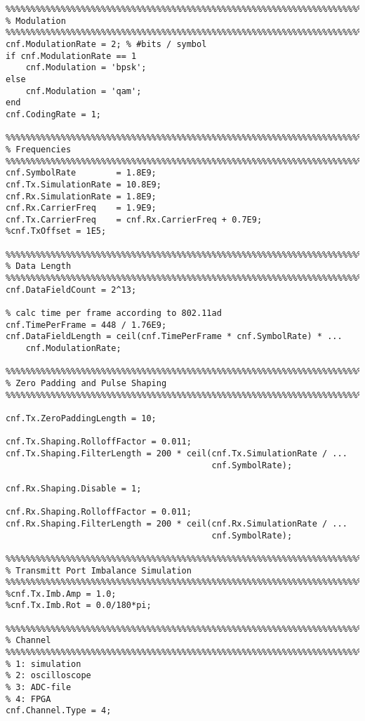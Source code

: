 \begin{appendix}
\begin{verbatim}
%%%%%%%%%%%%%%%%%%%%%%%%%%%%%%%%%%%%%%%%%%%%%%%%%%%%%%%%%%%%%%%%%%%%%%%%%%%%%%%%
% Modulation
%%%%%%%%%%%%%%%%%%%%%%%%%%%%%%%%%%%%%%%%%%%%%%%%%%%%%%%%%%%%%%%%%%%%%%%%%%%%%%%%
cnf.ModulationRate = 2; % #bits / symbol
if cnf.ModulationRate == 1
    cnf.Modulation = 'bpsk';
else
    cnf.Modulation = 'qam';
end
cnf.CodingRate = 1;

%%%%%%%%%%%%%%%%%%%%%%%%%%%%%%%%%%%%%%%%%%%%%%%%%%%%%%%%%%%%%%%%%%%%%%%%%%%%%%%%
% Frequencies
%%%%%%%%%%%%%%%%%%%%%%%%%%%%%%%%%%%%%%%%%%%%%%%%%%%%%%%%%%%%%%%%%%%%%%%%%%%%%%%%
cnf.SymbolRate        = 1.8E9;
cnf.Tx.SimulationRate = 10.8E9;
cnf.Rx.SimulationRate = 1.8E9;
cnf.Rx.CarrierFreq    = 1.9E9;
cnf.Tx.CarrierFreq    = cnf.Rx.CarrierFreq + 0.7E9;
%cnf.TxOffset = 1E5;

%%%%%%%%%%%%%%%%%%%%%%%%%%%%%%%%%%%%%%%%%%%%%%%%%%%%%%%%%%%%%%%%%%%%%%%%%%%%%%%%
% Data Length
%%%%%%%%%%%%%%%%%%%%%%%%%%%%%%%%%%%%%%%%%%%%%%%%%%%%%%%%%%%%%%%%%%%%%%%%%%%%%%%%
cnf.DataFieldCount = 2^13;

% calc time per frame according to 802.11ad
cnf.TimePerFrame = 448 / 1.76E9;
cnf.DataFieldLength = ceil(cnf.TimePerFrame * cnf.SymbolRate) * ...
    cnf.ModulationRate;

%%%%%%%%%%%%%%%%%%%%%%%%%%%%%%%%%%%%%%%%%%%%%%%%%%%%%%%%%%%%%%%%%%%%%%%%%%%%%%%%
% Zero Padding and Pulse Shaping
%%%%%%%%%%%%%%%%%%%%%%%%%%%%%%%%%%%%%%%%%%%%%%%%%%%%%%%%%%%%%%%%%%%%%%%%%%%%%%%%

cnf.Tx.ZeroPaddingLength = 10;

cnf.Tx.Shaping.RolloffFactor = 0.011;
cnf.Tx.Shaping.FilterLength = 200 * ceil(cnf.Tx.SimulationRate / ...
                                         cnf.SymbolRate);

cnf.Rx.Shaping.Disable = 1;

cnf.Rx.Shaping.RolloffFactor = 0.011;
cnf.Rx.Shaping.FilterLength = 200 * ceil(cnf.Rx.SimulationRate / ...
                                         cnf.SymbolRate);

%%%%%%%%%%%%%%%%%%%%%%%%%%%%%%%%%%%%%%%%%%%%%%%%%%%%%%%%%%%%%%%%%%%%%%%%%%%%%%%%
% Transmitt Port Imbalance Simulation
%%%%%%%%%%%%%%%%%%%%%%%%%%%%%%%%%%%%%%%%%%%%%%%%%%%%%%%%%%%%%%%%%%%%%%%%%%%%%%%%
%cnf.Tx.Imb.Amp = 1.0;
%cnf.Tx.Imb.Rot = 0.0/180*pi;

%%%%%%%%%%%%%%%%%%%%%%%%%%%%%%%%%%%%%%%%%%%%%%%%%%%%%%%%%%%%%%%%%%%%%%%%%%%%%%%%
% Channel
%%%%%%%%%%%%%%%%%%%%%%%%%%%%%%%%%%%%%%%%%%%%%%%%%%%%%%%%%%%%%%%%%%%%%%%%%%%%%%%%
% 1: simulation
% 2: oscilloscope
% 3: ADC-file
% 4: FPGA
cnf.Channel.Type = 4;


\end{verbatim}
\end{appendix}
